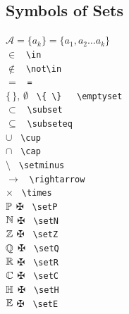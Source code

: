 \subsection{Symbols of Sets}
\begin{tabbing}
\mySymbols
 $\mathcal{A}=\{a_k\}=\{a_1,a_2\dots a_k\}$ 
                       \>                     \> \verb`   `  \\
 $\in $                \>                     \> \verb` \in  `  \\
 $\not\in $            \>                     \> \verb` \not\in  `  \\
 $= $                  \>                     \> \verb` = `  \\
 $\{\,\},\,\emptyset$  \>                     \> \verb` \{ \}   \emptyset`  \\
 $\subset     $        \>                     \> \verb` \subset`  \\
 $\subseteq   $        \>                     \> \verb` \subseteq`  \\
 $\cup        $        \>                     \> \verb` \cup         `  \\
 $\cap        $        \>                     \> \verb` \cap         `  \\
 $\setminus   $        \>                     \> \verb` \setminus    `  \\
 $\rightarrow $        \>                     \> \verb` \rightarrow  `  \\
 $\times      $        \>                     \> \verb` \times       `  \\
 $\mathbb{P} $              \>                     \> $\maltese$ \verb` \setP  `  \\
 $\mathbb{N} $              \>                     \> $\maltese$ \verb` \setN  `  \\
 $\mathbb{Z} $              \>                     \> $\maltese$ \verb` \setZ  `  \\
 $\mathbb{Q} $              \>                     \> $\maltese$ \verb` \setQ  `  \\
 $\mathbb{R} $              \>                     \> $\maltese$ \verb` \setR  `  \\
 $\mathbb{C} $              \>                     \> $\maltese$ \verb` \setC  `  \\
 $\mathbb{H} $              \>                     \> $\maltese$ \verb` \setH  `  \\
 $\mathbb{E} $              \>                     \> $\maltese$ \verb` \setE  `  \\
\end{tabbing}

